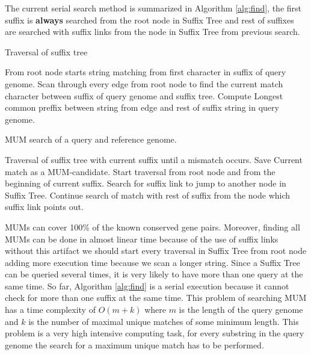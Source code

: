 \documentclass[3p,times]{elsarticle}
\begin{document}
 The current serial search method is summarized in Algorithm \ref{alg:find}, the first suffix is \textbf{always} searched from the root node in Suffix Tree and rest of suffixes are searched with suffix links from the node in Suffix Tree from previous search.\\
 \begin{algorithm}
   \caption{Traversal of suffix tree}
   \begin{algorithmic}[1]
     \State From root node starts string matching from first character in suffix of query genome.
     \State Scan through every edge from root node to find the current match character between suffix of query genome and suffix tree.
     \State Compute Longest common preffix between string from edge and rest of suffix string in query genome.
     \EndIf
     \EndWhile
   \end{algorithmic}
 \end{algorithm}
 \begin{algorithm}
   \caption{MUM search of a query and reference genome.} \label{alg:find}
 \begin{algorithmic}[1]
   \State Traversal of suffix tree with current suffix until a mismatch occurs.
   \State Save Current match as a MUM-candidate. 
   \EndIf
   \State Start traversal from root node and from the beginning of current suffix.
   \State Search for suffix link to jump to another node in Suffix Tree.
   \State Continue search of match with rest of suffix from the node which suffix link points out.
   \EndIf
   \EndFor
 \end{algorithmic}
 \end{algorithm}
 MUMs can cover 100\% of the known  conserved gene pairs. Moreover, finding all MUMs  can be done in almost linear time because of the use of suffix links without this artifact we should start every traversal in Suffix Tree from root node adding more execution time because we scan a longer string. Since a Suffix Tree can be queried several times, it is very likely to have more than one query  at the same time. So far, Algorithm \ref{alg:find} is a serial execution because it cannot check for more than one suffix at the same time.
This problem of searching MUM has a time complexity of $O(m+k)$ where $m$ is the length of the query genome and $k$ is the number of maximal unique matches of some minimum length. This problem is a very high intensive computing task, for every substring in the query genome the search for a maximum unique match has to be performed.
\end{document}
